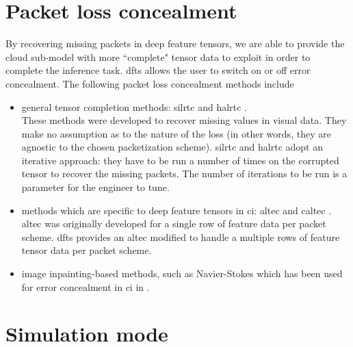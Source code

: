 \section{Packet loss concealment} \label{sec:simdescr:ec}
By recovering missing packets in deep feature tensors, we are able to provide the cloud sub-model with more ``complete" tensor data to exploit in order to complete the inference task. \gls{dfts} allows the user to switch on or off error concealment. The following packet loss concealment methods include
\begin{itemize}
	\item general tensor completion methods: \gls{silrtc} \cite{liu2012tensor} and \gls{halrtc} \cite{liu2012tensor}.\\
	These methods were developed to recover missing values in visual data. They make no assumption as to the nature of the loss (in other words, they are agnostic to the chosen packetization scheme). \gls{silrtc} and \gls{halrtc} adopt an iterative approach: they have to be run a number of times on the corrupted tensor to recover the missing packets. The number of iterations to be run is a parameter for the engineer to tune.
	\item methods which are specific to deep feature tensors in \gls{ci}: \gls{altec} \cite{Bragile2020} and \gls{caltec} \cite{CALTeC_ICIP_2021}. \\ \gls{altec} was originally developed for a single row of feature data per packet scheme. \gls{dfts} provides an \gls{altec} modified to handle a multiple rows of feature tensor data per packet scheme.
	\item image inpainting-based methods, such as Navier-Stokes \cite{navierstokes} which has been used for error concealment in \gls{ci} in \cite{Bajic2021objdet}.
\end{itemize}

\section{Simulation mode} \label{sec:simdescr:simmode}